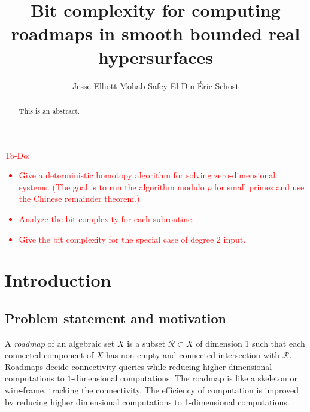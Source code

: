 \documentclass[12pt]{article}
\title{Bit complexity for computing roadmaps in smooth bounded real hypersurfaces}
\author{
    Jesse Elliott\footnotemark[1]\hspace{2mm}\footnotemark[2]\hspace{2mm}\footnotemark[3]
    \quad
    Mohab Safey El Din
    \quad
    Éric Schost\footnotemark[2]
}
\date{} %
\begin{document}
%
\maketitle







\begin{abstract}
This is an abstract. 
\end{abstract}








\textcolor{red}{
To-Do:
\begin{itemize}
    \item Give a deterministic homotopy algorithm for solving zero-dimensional systems. (The goal is to run the algorithm modulo $p$ for small primes and use the Chinese remainder theorem.) 
    \item Analyze the bit complexity for each subroutine.
    \item Give the bit complexity for the special case of degree 2 input. 
\end{itemize}
}




\section{Introduction}\label{sec:chap5Int}
\subsection{Problem statement and motivation} 
A \textit{roadmap} of an algebraic set $X$ is a subset $\mathscr{R}\subset X$ of dimension 1 such that each connected component of $X$ has non-empty and connected intersection with $\mathscr{R}$. Roadmaps decide connectivity queries while reducing higher dimensional computations to $1$-dimensional computations. The roadmap is like a skeleton or wire-frame, tracking the connectivity. The efficiency of computation is improved by reducing higher dimensional computations to 1-dimensional computations. 
\end{document}
